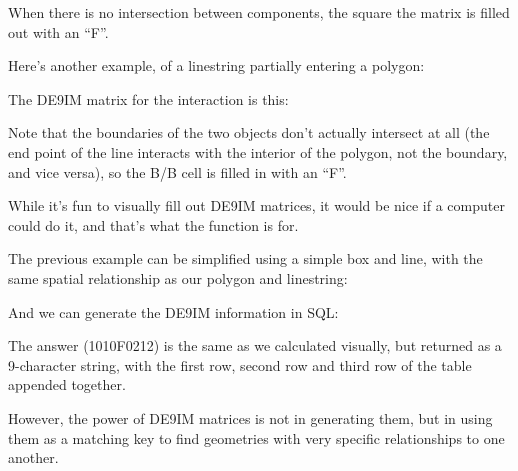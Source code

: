 \documentclass[a4paper,11pt,english]{sphinxmanual}
\begin{document}
When there is no intersection between components, the square the matrix is filled out with an “F”.

Here’s another example, of a linestring partially entering a polygon:

\noindent{}

The DE9IM matrix for the interaction is this:

\noindent{}

Note that the boundaries of the two objects don’t actually intersect at all (the end point of the line interacts with the interior of the polygon, not the boundary, and vice versa), so the B/B cell is filled in with an “F”.

While it’s fun to visually fill out DE9IM matrices, it would be nice if a computer could do it, and that’s what the  function is for.

The previous example can be simplified using a simple box and line, with the same spatial relationship as our polygon and linestring:

\noindent{}

And we can generate the DE9IM information in SQL:

\begin{sphinxVerbatim}[commandchars=\\\{\}]
 
\end{sphinxVerbatim}

The answer (1010F0212) is the same as we calculated visually, but returned as a 9-character string, with the first row, second row and third row of the table appended together.

\begin{sphinxVerbatim}[commandchars=\\\{\}]
\end{sphinxVerbatim}

However, the power of DE9IM matrices is not in generating them, but in using them as a matching key to find geometries with very specific relationships to one another.
\end{document}
